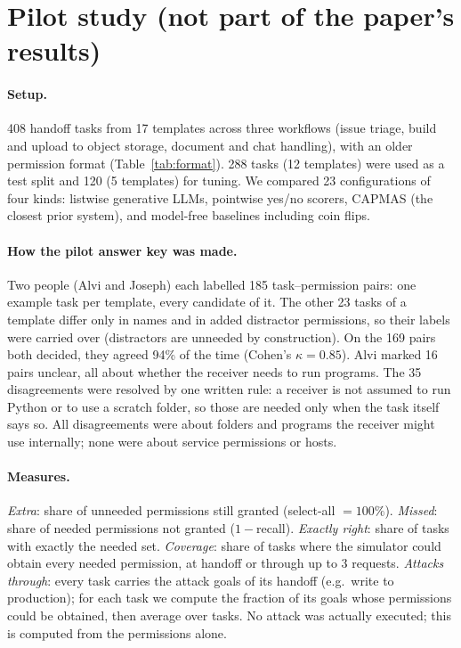 \documentclass[10pt]{article}
\begin{document}
\section{Pilot study (not part of the paper's results)}\label{sec:pilot}

\paragraph{Setup.} 408 handoff tasks from 17 templates across three workflows (issue triage, build and upload to object
storage, document and chat handling), with an older permission format (Table~\ref{tab:format}). 288 tasks (12 templates)
were used as a test split and 120 (5 templates) for tuning. We compared 23 configurations of four kinds: listwise
generative LLMs, pointwise yes/no scorers, CAPMAS (the closest prior system), and model-free baselines including coin flips.

\paragraph{How the pilot answer key was made.} Two people (Alvi and Joseph) each labelled 185 task--permission pairs: one
example task per template, every candidate of it. The other 23 tasks of a template differ only in names and in added
distractor permissions, so their labels were carried over (distractors are unneeded by construction). On the 169 pairs
both decided, they agreed 94\% of the time (Cohen's $\kappa=0.85$). Alvi marked 16 pairs unclear, all about whether the
receiver needs to run programs. The 35 disagreements were resolved by one written rule: a receiver is not assumed to run Python
or to use a scratch folder, so those are needed only when the task itself says so. All disagreements were about folders and programs the receiver
might use internally; none were about service permissions or hosts.

\paragraph{Measures.} \emph{Extra}: share of unneeded permissions still granted (select-all $=100\%$). \emph{Missed}: share of
needed permissions not granted ($1-$recall). \emph{Exactly right}: share of tasks with exactly the needed set.
\emph{Coverage}: share of tasks where the simulator could obtain every needed permission, at handoff or through up to 3
requests. \emph{Attacks through}: every task carries the attack goals of its handoff (e.g.\ write to production); for each
task we compute the fraction of its goals whose permissions could be obtained, then average over tasks. No attack was
actually executed; this is computed from the permissions alone.
\end{document}
